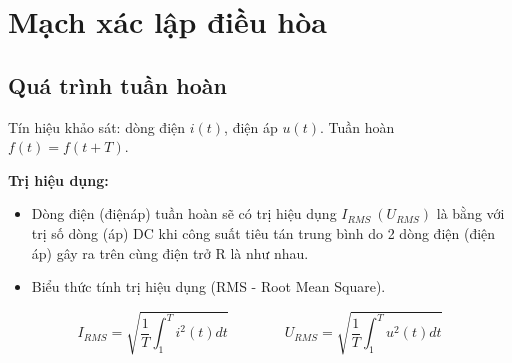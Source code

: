\section{Mạch xác lập điều hòa}
\subsection{Quá trình tuần hoàn}
Tín hiệu khảo sát: dòng điện $i(t)$, điện áp $u(t)$. Tuần hoàn $f(t) = f(t+T)$.

\textbf{Trị hiệu dụng:}
\begin{itemize}
    \item Dòng điện (điệnáp) tuần hoàn sẽ có trị hiệu dụng $I_{RMS} \ (U_{RMS})$ là bằng với trị số dòng (áp) DC khi công suất tiêu tán trung bình do 2 dòng điện (điện áp) gây ra trên cùng điện trở R là như nhau.
    \item Biểu thức tính trị hiệu dụng (RMS - Root Mean Square).
\end{itemize}
\begin{equation}
    I_{RMS} = \sqrt{\frac{1}{T} \int_{1}^{T} i^2(t)dt} \qquad \qquad U_{RMS} = \sqrt{\frac{1}{T} \int_{1}^{T} u^2(t)dt}
\end{equation}
